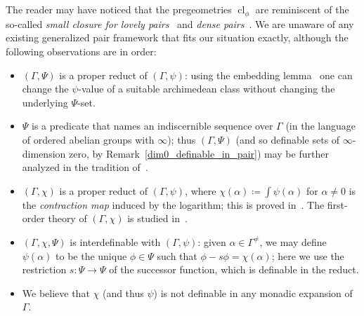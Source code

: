 \documentclass[11pt]{amsart}
\theoremstyle{plain}
\theoremstyle{definition}
\numberwithin{equation}{section}
\newcommand\0{\varnothing}
\DeclareMathOperator\cl{cl}
\begin{document}
\subsection{}The reader may have noticed that the pregeometries $\cl_{\phi}$ are reminiscent of the so-called \emph{small closure for lovely pairs}~\cite[Definition 4.5]{berenstein2010lovely} and \emph{dense pairs}~\cite[Definition 8.27]{fornasiero-dimmatroiddense}. We are unaware of any existing generalized pair framework that fits our situation exactly, although the following observations are in order:
\begin{itemize}
\item $(\Gamma,\Psi)$ is a proper reduct of $(\Gamma,\psi)$: using the embedding lemma~\cite[4.6]{GehretACTlog} one can change the $\psi$-value of a suitable archimedean class without changing the underlying $\Psi$-set.
\item $\Psi$ is a predicate that names an indiscernible sequence over $\Gamma$ (in the language of ordered abelian groups with $\infty$); thus $(\Gamma,\Psi)$ (and so definable sets of $\infty$-dimension zero, by Remark~\ref{dim0_definable_in_pair}) may be further analyzed in the tradition of~\cite{baldwin2000stability}.
\item $(\Gamma,\chi)$ is a proper reduct of $(\Gamma,\psi)$, where $\chi(\alpha)\coloneqq \int\psi(\alpha)$ for $\alpha \neq 0$ is the \emph{contraction map} induced by the logarithm; this is proved in~\cite[Section~7.3]{GehretACTlogNIP}. The first-order theory of $(\Gamma,\chi)$ is studied in~\cite{bautista2019precontraction}.
\item $(\Gamma,\chi,\Psi)$ is interdefinable with $(\Gamma,\psi)$: given $\alpha\in\Gamma^{\neq}$, we may define $\psi(\alpha)$ to be the unique $\phi\in\Psi$ such that $\phi-s\phi=\chi(\alpha)$; here we use the restriction $s\colon\Psi\to\Psi$ of the successor function, which is definable in the reduct.
\item We believe that $\chi$ (and thus $\psi$) is not definable in any monadic expansion of $\Gamma$.
\end{itemize}
\end{document}
